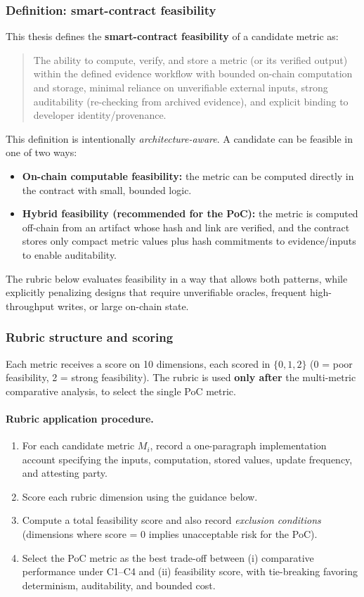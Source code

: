 \subsubsection{Definition: smart-contract feasibility}
This thesis defines the \textbf{smart-contract feasibility} of a candidate metric as:
\begin{quote}
The ability to compute, verify, and store a metric (or its verified output) within the defined evidence workflow
with bounded on-chain computation and storage, minimal reliance on unverifiable external inputs, strong auditability
(re-checking from archived evidence), and explicit binding to developer identity/provenance.
\end{quote}

This definition is intentionally \emph{architecture-aware}. A candidate can be feasible in one of two ways:
\begin{itemize}[leftmargin=*]
  \item \textbf{On-chain computable feasibility:} the metric can be computed directly in the contract with small, bounded logic.
  \item \textbf{Hybrid feasibility (recommended for the PoC):} the metric is computed off-chain from an artifact whose hash and link are verified,
  and the contract stores only compact metric values plus hash commitments to evidence/inputs to enable auditability.
\end{itemize}
The rubric below evaluates feasibility in a way that allows both patterns, while explicitly penalizing designs that
require unverifiable oracles, frequent high-throughput writes, or large on-chain state.

\subsubsection{Rubric structure and scoring}
Each metric receives a score on 10 dimensions, each scored in $\{0,1,2\}$ (0 = poor feasibility, 2 = strong feasibility).
The rubric is used \textbf{only after} the multi-metric comparative analysis, to select the single PoC metric.

\paragraph{Rubric application procedure.}
\begin{enumerate}[leftmargin=*]
  \item For each candidate metric $M_i$, record a one-paragraph implementation account specifying the inputs,
  computation, stored values, update frequency, and attesting party.
  \item Score each rubric dimension using the guidance below.
  \item Compute a total feasibility score and also record \emph{exclusion conditions} (dimensions where score = 0
  implies unacceptable risk for the PoC).
  \item Select the PoC metric as the best trade-off between (i) comparative performance under C1--C4 and
  (ii) feasibility score, with tie-breaking favoring determinism, auditability, and bounded cost.
\end{enumerate}


